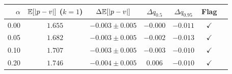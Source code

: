\begin{tabular}{rcccccc}
\hline
$\alpha$ & $\mathbb{E}[|p-v|]$ ($k=1$) & $\Delta\mathbb{E}[|p-v|]$ & $\Delta q_{0.5}$ & $\Delta q_{0.95}$ & Flag \\
\hline
0.00 & $1.655$ & $-0.003\pm0.005$ & $-0.000$ & $-0.011$ & $\checkmark$ \\
0.05 & $1.682$ & $-0.003\pm0.005$ & $-0.002$ & $-0.013$ & $\checkmark$ \\
0.10 & $1.707$ & $-0.003\pm0.005$ & $-0.003$ & $-0.010$ & $\checkmark$ \\
0.20 & $1.746$ & $-0.004\pm0.005$ & $0.006$ & $-0.010$ & $\checkmark$ \\
\hline
\end{tabular}
